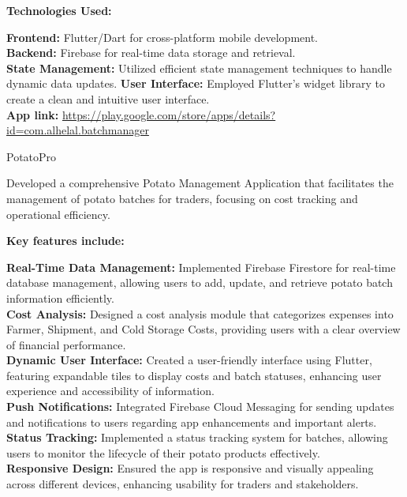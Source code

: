 \documentclass[a4paper,12pt]{article}
\begin{document}
\begin{CV}
\textbf{Technologies Used:}

\textbf{Frontend:} Flutter/Dart for cross-platform mobile development.\\
\textbf{Backend:} Firebase for real-time data storage and retrieval.\\
\textbf{State Management:} Utilized efficient state management techniques to handle dynamic data updates.
\textbf{User Interface:} Employed Flutter’s widget library to create a clean and intuitive user interface.\\
\textbf{App link:} \href{https://play.google.com/store/apps/details?id=com.alhelal.batchmanager}{https://play.google.com/store/apps/details?id=com.alhelal.batchmanager}
\item[PotatoPro]
  

Developed a comprehensive Potato Management Application that facilitates the management of potato batches for traders, focusing on cost tracking and operational efficiency.

\textbf{Key features include:}

\textbf{Real-Time Data Management:} Implemented Firebase Firestore for real-time database management, allowing users to add, update, and retrieve potato batch information efficiently.\\

\textbf{Cost Analysis:} Designed a cost analysis module that categorizes expenses into Farmer, Shipment, and Cold Storage Costs, providing users with a clear overview of financial performance.\\

\textbf{Dynamic User Interface:} Created a user-friendly interface using Flutter, featuring expandable tiles to display costs and batch statuses, enhancing user experience and accessibility of information.\\

\textbf{Push Notifications:} Integrated Firebase Cloud Messaging for sending updates and notifications to users regarding app enhancements and important alerts.\\

\textbf{Status Tracking:} Implemented a status tracking system for batches, allowing users to monitor the lifecycle of their potato products effectively.\\

\textbf{Responsive Design:} Ensured the app is responsive and visually appealing across different devices, enhancing usability for traders and stakeholders.\\


\end{CV}
\end{document}
